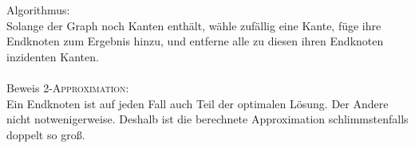 Algorithmus:\\
Solange der Graph noch Kanten enthält, wähle zufällig eine Kante, füge ihre Endknoten zum Ergebnis hinzu, und entferne alle zu diesen ihren Endknoten inzidenten Kanten.\\ \ \\
Beweis \textsc{2-Approximation}:\\
Ein Endknoten ist auf jeden Fall auch Teil der optimalen Lösung. Der Andere nicht notwenigerweise. Deshalb ist die berechnete Approximation schlimmstenfalls doppelt so groß.
